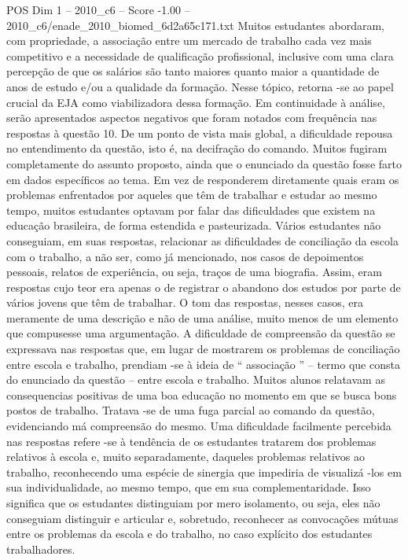 \begin{textsample}{POS Dim 1 – 2010\_c6 – Score -1.00 – 2010\_c6/enade\_2010\_biomed\_6d2a65c171.txt}
Muitos estudantes abordaram, com propriedade, a associação entre um mercado de trabalho cada vez mais competitivo e a necessidade de qualificação profissional, inclusive com uma clara percepção de que os salários são tanto maiores quanto maior a quantidade de anos de estudo e/ou a qualidade da formação.
Nesse tópico, retorna -se ao papel crucial da EJA como viabilizadora dessa formação.
Em continuidade à análise, serão apresentados aspectos negativos que foram notados com frequência nas respostas à questão 10.
De um ponto de vista mais global, a dificuldade repousa no entendimento da questão, isto é, na decifração do comando.
Muitos fugiram completamente do assunto proposto, ainda que o enunciado da questão fosse farto em dados específicos ao tema.
Em vez de responderem diretamente quais eram os problemas enfrentados por aqueles que têm de trabalhar e estudar ao mesmo tempo, muitos estudantes optavam por falar das dificuldades que existem na educação brasileira, de forma estendida e pasteurizada.
Vários estudantes não conseguiam, em suas respostas, relacionar as dificuldades de conciliação da escola com o trabalho, a não ser, como já mencionado, nos casos de depoimentos pessoais, relatos de experiência, ou seja, traços de uma biografia.
Assim, eram respostas cujo teor era apenas o de registrar o abandono dos estudos por parte de vários jovens que têm de trabalhar.
O tom das respostas, nesses casos, era meramente de uma descrição e não de uma análise, muito menos de um elemento que compusesse uma argumentação.
A dificuldade de compreensão da questão se expressava nas respostas que, em lugar de mostrarem os problemas de conciliação entre escola e trabalho, prendiam -se à ideia de “ associação ” – termo que consta do enunciado da questão – entre escola e trabalho.
Muitos alunos relatavam as consequencias positivas de uma boa educação no momento em que se busca bons postos de trabalho.
Tratava -se de uma fuga parcial ao comando da questão, evidenciando má compreensão do mesmo.
Uma dificuldade facilmente percebida nas respostas refere -se à tendência de os estudantes tratarem dos problemas relativos à escola e, muito separadamente, daqueles problemas relativos ao trabalho, reconhecendo uma espécie de sinergia que impediria de visualizá -los em sua individualidade, ao mesmo tempo, que em sua complementaridade.
Isso significa que os estudantes distinguiam por mero isolamento, ou seja, eles não conseguiam distinguir e articular e, sobretudo, reconhecer as convocações mútuas entre os problemas da escola e do trabalho, no caso explícito dos estudantes trabalhadores.

\end{textsample}
